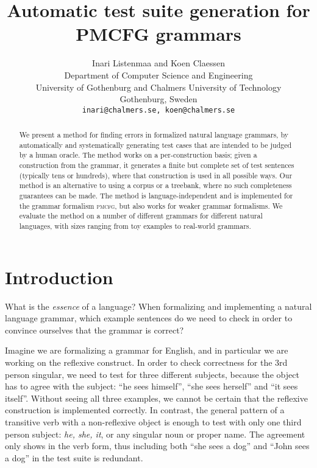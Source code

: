 \documentclass[11pt]{article}
\def\pmcfg{\textsc{pmcfg}}
\begin{document}
%
\title{Automatic test suite generation for PMCFG grammars}
%
\author{Inari Listenmaa and Koen Claessen \\
  Department of Computer Science and Engineering \\
  University of Gothenburg and Chalmers University of Technology \\
  Gothenburg, Sweden \\
  {\tt inari@chalmers.se, koen@chalmers.se} }

\maketitle              %
%
\begin{abstract}
We present a method for finding errors in formalized natural language grammars, by automatically and systematically generating test cases that are intended to be judged by a human oracle. The method works on a per-construction basis; given a construction from the grammar, it generates a finite but complete set of test sentences (typically tens or hundreds), where that construction is used in all possible ways. Our method is an alternative to using a corpus or a treebank, where no such completeness guarantees can be made. The method is language-independent and is implemented for the grammar formalism \pmcfg{}, but also works for weaker grammar formalisms. We evaluate the method on a number of different grammars for different natural languages, with sizes ranging from toy examples to real-world grammars.
\end{abstract}
%
%
%
\section{Introduction}

What is the \emph{essence} of a language? When formalizing and implementing a natural language grammar, which example sentences do we need to check in order to convince ourselves that the grammar is correct?

Imagine we are formalizing a grammar for English, and in particular we are working on the reflexive construct. In order to check correctness for the 3rd person singular, we need to test for three different subjects, because
the object has to agree with the subject: ``he sees himself'', ``she
sees herself'' and ``it sees itself''. Without seeing all three
examples, we cannot be certain that the reflexive construction is
implemented correctly. In contrast, the general pattern of a transitive
verb with a non-reflexive object is enough to test with only one third
person subject: \emph{he, she, it}, or any singular noun or proper
name. The agreement only shows in the verb form, thus including both
``she sees a dog'' and ``John sees a dog'' in the test suite is redundant. 
\end{document}
